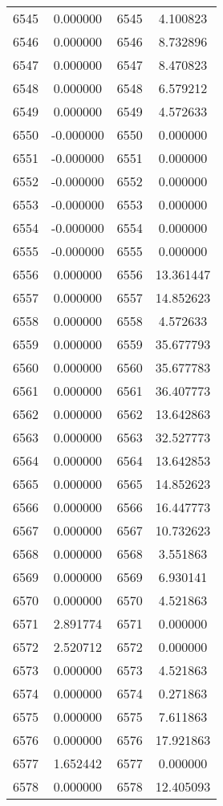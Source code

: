 \documentclass[12pt]{article}
\begin{document}
\begin{longtable}{@{}cccc@{}}
6545 & 0.000000 & 6545 & 4.100823 \\
6546 & 0.000000 & 6546 & 8.732896 \\
6547 & 0.000000 & 6547 & 8.470823 \\
6548 & 0.000000 & 6548 & 6.579212 \\
6549 & 0.000000 & 6549 & 4.572633 \\
6550 & -0.000000 & 6550 & 0.000000 \\
6551 & -0.000000 & 6551 & 0.000000 \\
6552 & -0.000000 & 6552 & 0.000000 \\
6553 & -0.000000 & 6553 & 0.000000 \\
6554 & -0.000000 & 6554 & 0.000000 \\
6555 & -0.000000 & 6555 & 0.000000 \\
6556 & 0.000000 & 6556 & 13.361447 \\
6557 & 0.000000 & 6557 & 14.852623 \\
6558 & 0.000000 & 6558 & 4.572633 \\
6559 & 0.000000 & 6559 & 35.677793 \\
6560 & 0.000000 & 6560 & 35.677783 \\
6561 & 0.000000 & 6561 & 36.407773 \\
6562 & 0.000000 & 6562 & 13.642863 \\
6563 & 0.000000 & 6563 & 32.527773 \\
6564 & 0.000000 & 6564 & 13.642853 \\
6565 & 0.000000 & 6565 & 14.852623 \\
6566 & 0.000000 & 6566 & 16.447773 \\
6567 & 0.000000 & 6567 & 10.732623 \\
6568 & 0.000000 & 6568 & 3.551863 \\
6569 & 0.000000 & 6569 & 6.930141 \\
6570 & 0.000000 & 6570 & 4.521863 \\
6571 & 2.891774 & 6571 & 0.000000 \\
6572 & 2.520712 & 6572 & 0.000000 \\
6573 & 0.000000 & 6573 & 4.521863 \\
6574 & 0.000000 & 6574 & 0.271863 \\
6575 & 0.000000 & 6575 & 7.611863 \\
6576 & 0.000000 & 6576 & 17.921863 \\
6577 & 1.652442 & 6577 & 0.000000 \\
6578 & 0.000000 & 6578 & 12.405093 \\

\end{longtable}
\end{document}
